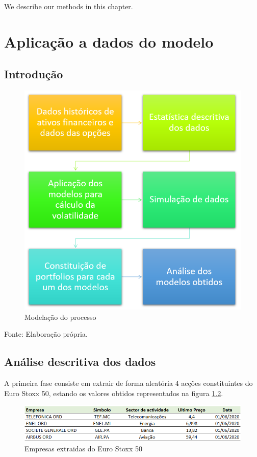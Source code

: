 \documentclass[
  12pt,
  a4paper,
  openany]{book}
\begin{document}
\newpage

We describe our methods in this chapter.

\hypertarget{aplicauxe7uxe3o-a-dados-do-modelo}{%
\chapter{Aplicação a dados do modelo}\label{aplicauxe7uxe3o-a-dados-do-modelo}}

\endgroup
\newpage

\hypertarget{introduuxe7uxe3o}{%
\section{Introdução}\label{introduuxe7uxe3o}}

\begin{figure}

{\centering \includegraphics[width=0.5\linewidth]{image/modelação} 

}

\caption{Modelação do processo}\label{fig:processo}
\end{figure}
\FloatBarrier
\centering

Fonte: Elaboração própria.

\hypertarget{anuxe1lise-descritiva-dos-dados}{%
\section{Análise descritiva dos dados}\label{anuxe1lise-descritiva-dos-dados}}

A primeira fase consiste em extrair de forma aleatória 4 acções constituintes do Euro Stoxx 50, estando os valores obtidos representados na figura \ref{fig:empresas}.

\begin{figure}

{\centering \includegraphics[width=1\linewidth]{image/cotacao} 

}

\caption{Empresas extraidas do Euro Stoxx 50}\label{fig:empresas}
\end{figure}
\FloatBarrier
\centering
\end{document}
